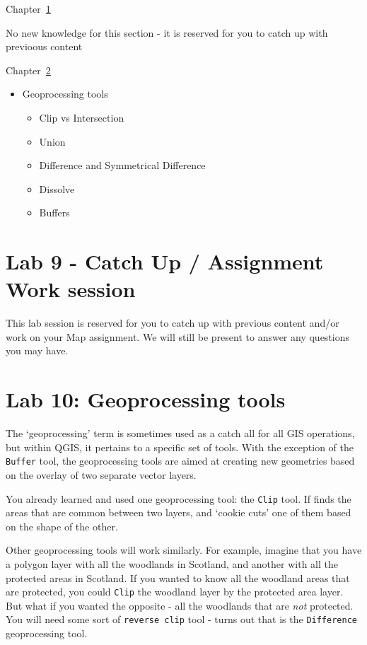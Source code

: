 \documentclass[
  letterpaper,
  DIV=11,
  numbers=noendperiod]{scrreprt}
\providecommand{\tightlist}{%
  \setlength{\itemsep}{0pt}\setlength{\parskip}{0pt}}\usepackage{longtable,booktabs,array}
\begin{document}
Chapter~\ref{sec-catch1}

No new knowledge for this section - it is reserved for you to catch up
with previoous content

Chapter~\ref{sec-spatan1}

\begin{itemize}
\tightlist
\item
  Geoprocessing tools

  \begin{itemize}
  \tightlist
  \item
    Clip vs Intersection
  \item
    Union
  \item
    Difference and Symmetrical Difference
  \item
    Dissolve
  \item
    Buffers
  \end{itemize}
\end{itemize}

\chapter{Lab 9 - Catch Up / Assignment Work session}\label{sec-catch1}

This lab session is reserved for you to catch up with previous content
and/or work on your Map assignment. We will still be present to answer
any questions you may have.

\chapter{Lab 10: Geoprocessing tools}\label{sec-spatan1}

The `geoprocessing' term is sometimes used as a catch all for all GIS
operations, but within QGIS, it pertains to a specific set of tools.
With the exception of the \texttt{Buffer} tool, the geoprocessing tools
are aimed at creating new geometries based on the overlay of two
separate vector layers.

You already learned and used one geoprocessing tool: the \texttt{Clip}
tool. If finds the areas that are common between two layers, and `cookie
cuts' one of them based on the shape of the other.

Other geoprocessing tools will work similarly. For example, imagine that
you have a polygon layer with all the woodlands in Scotland, and another
with all the protected areas in Scotland. If you wanted to know all the
woodland areas that are protected, you could \texttt{Clip} the woodland
layer by the protected area layer. But what if you wanted the opposite -
all the woodlands that are \emph{not} protected. You will need some sort
of \texttt{reverse\ clip} tool - turns out that is the
\texttt{Difference} geoprocessing tool.
\end{document}

